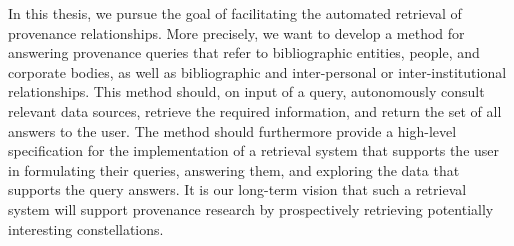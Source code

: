 In this thesis, we pursue the goal of facilitating
the automated retrieval of provenance relationships.
More precisely,
we want to develop a method for answering provenance queries that refer to bibliographic entities, people, and corporate bodies,
as well as bibliographic and inter-personal or inter-institutional relationships.
This method should, on input of a query,
autonomously consult relevant data sources,
retrieve the required information, and return the set of all answers to the user.
The method should furthermore provide a high-level specification
for the implementation of a retrieval system
that supports the user in formulating their queries, answering them, and exploring the data that supports the query answers.
It is our long-term vision that such a retrieval system will support provenance research
by prospectively retrieving potentially interesting constellations.

%

